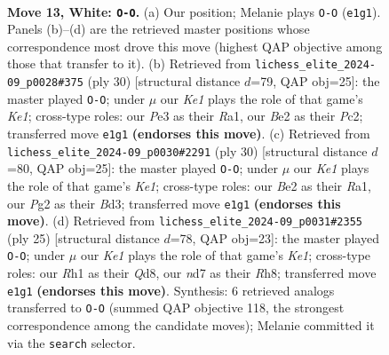 \documentclass[11pt]{article}
\begin{document}
\clearpage

\begin{figure}[p]\centering
\begin{subfigure}{0.46\textwidth}\centering
\resizebox{\linewidth}{!}{%
\newchessgame
\chessboard[
  setfen={1rbqk2r/pp1n2pp/2p5/3p2p1/3P4/2N1P3/PP2BPPP/R2QK2R w KQk - 0 13},
  showmover=false,
  pgfstyle=straightmove, color=movearrow, markmove={e1-g1}
]}
\caption{}
\end{subfigure}\hfill
\begin{subfigure}{0.46\textwidth}\centering
\resizebox{\linewidth}{!}{%
\newchessgame
\chessboard[
  setfen={r3k2r/1p1qbpp1/p2p1n1p/3Pp3/P7/2NB4/1PP2PPP/R2QK2R w KQkq - 1 16},
  showmover=false,
  pgfstyle=straightmove, color=movearrow, markmove={e1-g1}
]}
\caption{}
\end{subfigure}
\\[4pt]
\begin{subfigure}{0.46\textwidth}\centering
\resizebox{\linewidth}{!}{%
\newchessgame
\chessboard[
  setfen={r1bq1rk1/1p3ppp/4p3/1P1n4/p7/P2BPN2/5PPP/R2QK2R w KQ - 0 16},
  showmover=false,
  pgfstyle=straightmove, color=movearrow, markmove={e1-g1}
]}
\caption{}
\end{subfigure}\hfill
\begin{subfigure}{0.46\textwidth}\centering
\resizebox{\linewidth}{!}{%
\newchessgame
\chessboard[
  setfen={r1bqk2r/5ppp/p1np4/3Np1b1/Pp2P3/3B4/1PP2PPP/RN1QK2R b KQkq - 3 13},
  showmover=false,
  pgfstyle=straightmove, color=movearrow, markmove={e8-g8}
]}
\caption{}
\end{subfigure}
\caption{\textbf{Move 13, White: \texttt{O-O}.} (a) Our position; Melanie plays \texttt{O-O} (\texttt{e1g1}). Panels (b)--(d) are the retrieved master positions whose correspondence most drove this move (highest QAP objective among those that transfer to it). (b) Retrieved from \texttt{lichess\_elite\_2024-09\_p0028\#375} (ply 30) [structural distance $d$=79, QAP obj=25]: the master played \texttt{O-O}; under $\mu$ our \emph{Ke1} plays the role of that game's \emph{Ke1}; cross-type roles: our \emph{P}e3 as their \emph{R}a1, our \emph{B}e2 as their \emph{P}c2; transferred move \texttt{e1g1} \textbf{(endorses this move)}. (c) Retrieved from \texttt{lichess\_elite\_2024-09\_p0030\#2291} (ply 30) [structural distance $d$=80, QAP obj=25]: the master played \texttt{O-O}; under $\mu$ our \emph{Ke1} plays the role of that game's \emph{Ke1}; cross-type roles: our \emph{B}e2 as their \emph{R}a1, our \emph{P}g2 as their \emph{B}d3; transferred move \texttt{e1g1} \textbf{(endorses this move)}. (d) Retrieved from \texttt{lichess\_elite\_2024-09\_p0031\#2355} (ply 25) [structural distance $d$=78, QAP obj=23]: the master played \texttt{O-O}; under $\mu$ our \emph{Ke1} plays the role of that game's \emph{Ke1}; cross-type roles: our \emph{R}h1 as their \emph{Q}d8, our \emph{n}d7 as their \emph{R}h8; transferred move \texttt{e1g1} \textbf{(endorses this move)}. Synthesis: 6 retrieved analogs transferred to \texttt{O-O} (summed QAP objective 118, the strongest correspondence among the candidate moves); Melanie committed it via the \texttt{search} selector.}
\label{fig:thought-m24}
\end{figure}
\end{document}
